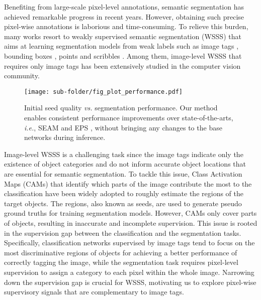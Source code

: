 \documentclass[10pt,twocolumn,letterpaper]{article}
\begin{document}
Benefiting from large-scale pixel-level annotations, semantic segmentation \cite{minaee2021imagesegmentation} has achieved remarkable progress in recent years. However, obtaining such precise pixel-wise annotations is laborious and time-consuming. To relieve this burden, many works resort to weakly supervised semantic segmentation (WSSS) that aims at learning segmentation models from weak labels such as image tags \cite{kolesnikov2016SEC, ahn2018learningAffinityNet, jiang2019integralOAA, zhang2020causalCONTA, wang2020selfSEAM, SPML, lee2021railroadEPS}, bounding boxes \cite{oh2021backgroundBox2}, points \cite{bearman2016sPoints1} and scribbles \cite{tang2018regularizedScrible2}. 
Among them, image-level WSSS that requires only image tags has been extensively studied in the computer vision community.


\begin{figure}[t]
\centering
\begin{center}
\texttt{[image: sub-folder/fig\_plot\_performance.pdf]}
\end{center}
\caption{Initial seed quality \textit{vs.} segmentation performance. Our method enables consistent performance improvements over state-of-the-arts, \textit{i.e.}, SEAM \cite{wang2020selfSEAM} and EPS \cite{lee2021railroadEPS}, without bringing any changes to the base networks during inference.}
\label{fig:plot_performance}
\end{figure}

Image-level WSSS is a challenging task since the image tags indicate only the existence of object categories and do not inform accurate object locations that are essential for semantic segmentation. 
To tackle this issue, Class Activation Maps (CAMs) \cite{zhou2016learningCAM} that identify which parts of the image contribute the most to the classification have been widely adopted to roughly estimate the regions of the target objects.
The regions, also known as seeds, are used to generate pseudo ground truths for training segmentation models.
However, CAMs only cover parts of objects, resulting in inaccurate and incomplete supervision.
This issue is rooted in the supervision gap between the classification and the segmentation tasks.
Specifically, classification networks supervised by image tags tend to focus on the most discriminative regions of objects for achieving a better performance of correctly tagging the image, while the segmentation task requires pixel-level supervision to assign a category to each pixel within the whole image.
Narrowing down the supervision gap is crucial for WSSS, motivating us to explore pixel-wise supervisory signals that are complementary to image tags. 
\end{document}

